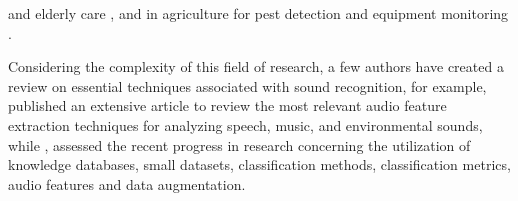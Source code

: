 and elderly care \cite{Saraubon2018}, and in agriculture for pest detection \cite{Branding2023} and equipment monitoring \cite{Jeong2022}.  


Considering the complexity of this field of research, a few authors have created a review on essential techniques associated with sound recognition, for example, \textcite{Alias2016} published an extensive article to review the most relevant audio feature extraction techniques for analyzing speech, music, and environmental sounds, while \textcite{Alli2022}, assessed the recent progress in research concerning the utilization of knowledge databases, small datasets, classification methods, classification metrics, audio features and data augmentation.

